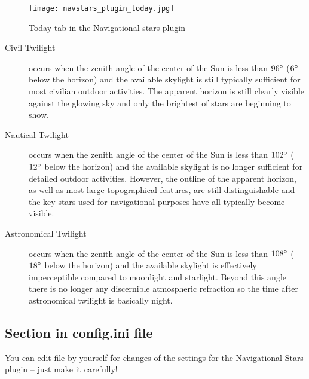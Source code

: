 \begin{figure}[htbp]
	\centering\texttt{[image: navstars\_plugin\_today.jpg]}
	\caption{Today tab in the Navigational stars plugin}
	\label{fig:plugin:NavigationalStars:Today}
\end{figure}

\begin{description}
	\item[Civil Twilight] occurs when the zenith angle of the center of the Sun is less than $96\degree$ ($6\degree$ below the horizon) and the available skylight is still typically sufficient for most civilian outdoor activities. The apparent horizon is still clearly visible against the glowing sky and only the brightest of stars are beginning to show.
	\item[Nautical Twilight] occurs when the zenith angle of the center of the Sun is less than $102\degree$ ($12\degree$ below the horizon) and the available skylight is no longer sufficient for detailed outdoor activities. However, the outline of the apparent horizon, as well as most large topographical features, are still distinguishable and the key stars used for navigational purposes have all typically become visible.
	\item[Astronomical Twilight] occurs when the zenith angle of the center of the Sun is less than $108\degree$ ($18\degree$ below the horizon) and the available skylight is effectively imperceptible compared to moonlight and starlight. Beyond this angle there is no longer any discernible atmospheric refraction so the time after astronomical twilight is basically night.
\end{description}

\subsection{Section  in config.ini file}

You can edit  file by yourself for changes of the
settings for the Navigational Stars plugin -- just make it carefully!

